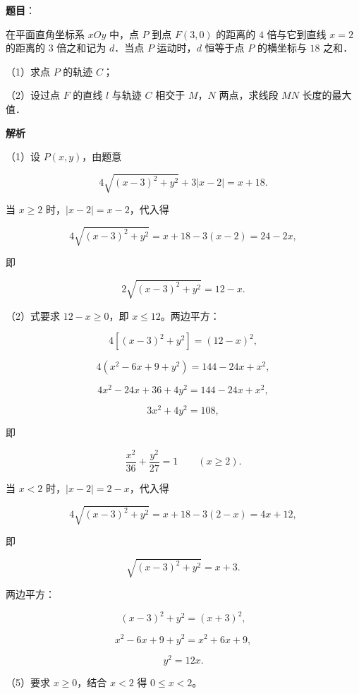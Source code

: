 \begin{answer}

\textbf{题目}：

在平面直角坐标系 $xOy$ 中，点 $P$ 到点 $F(3,0)$ 的距离的 $4$ 倍与它到直线 $x=2$ 的距离的 $3$ 倍之和记为 $d$．当点 $P$ 运动时，$d$ 恒等于点 $P$ 的横坐标与 $18$ 之和．

（1）求点 $P$ 的轨迹 $C$；

（2）设过点 $F$ 的直线 $l$ 与轨迹 $C$ 相交于 $M$，$N$ 两点，求线段 $MN$ 长度的最大值．

\textbf{解析}

（1）设 $P(x,y)$，由题意

\nopagebreak[4]
\[4\sqrt{(x-3)^2+y^2}+3|x-2|=x+18. \tag{1}\]

当 $x\geqslant2$ 时，$|x-2|=x-2$，代入得

\nopagebreak[4]
\[4\sqrt{(x-3)^2+y^2}=x+18-3(x-2)=24-2x,\]

即

\nopagebreak[4]
\[2\sqrt{(x-3)^2+y^2}=12-x. \tag{2}\]

（2）式要求 $12-x\geqslant0$，即 $x\leqslant12$。两边平方：

\nopagebreak[4]
\[4\left[(x-3)^2+y^2\right]=(12-x)^2,\]

\nopagebreak[4]
\[4(x^2-6x+9+y^2)=144-24x+x^2,\]

\nopagebreak[4]
\[4x^2-24x+36+4y^2=144-24x+x^2,\]

\nopagebreak[4]
\[3x^2+4y^2=108,\]

即

\nopagebreak[4]
\[\frac{x^2}{36}+\frac{y^2}{27}=1\qquad(x\geqslant2). \tag{3}\]

当 $x<2$ 时，$|x-2|=2-x$，代入得

\nopagebreak[4]
\[4\sqrt{(x-3)^2+y^2}=x+18-3(2-x)=4x+12,\]

即

\nopagebreak[4]
\[\sqrt{(x-3)^2+y^2}=x+3. \tag{4}\]

两边平方：

\nopagebreak[4]
\[(x-3)^2+y^2=(x+3)^2,\]

\nopagebreak[4]
\[x^2-6x+9+y^2=x^2+6x+9,\]

\nopagebreak[4]
\[y^2=12x. \tag{5}\]

（5）要求 $x\geqslant0$，结合 $x<2$ 得 $0\leqslant x<2$。


\end{answer}
